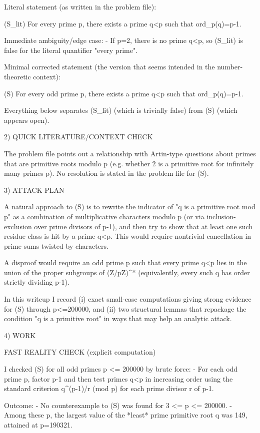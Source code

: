 Literal statement (as written in the problem file):

  (S_lit)  For every prime p, there exists a prime q<p such that ord_p(q)=p-1.

Immediate ambiguity/edge case:
- If p=2, there is no prime q<p, so (S_lit) is false for the literal quantifier "every prime".

Minimal corrected statement (the version that seems intended in the number-theoretic context):

  (S)  For every odd prime p, there exists a prime q<p such that ord_p(q)=p-1.

Everything below separates (S_lit) (which is trivially false) from (S) (which appears open).

2) QUICK LITERATURE/CONTEXT CHECK

The problem file points out a relationship with Artin-type questions about primes that are
primitive roots modulo p (e.g. whether 2 is a primitive root for infinitely many primes p).
No resolution is stated in the problem file for (S).

3) ATTACK PLAN

A natural approach to (S) is to rewrite the indicator of "q is a primitive root mod p" as a
combination of multiplicative characters modulo p (or via inclusion-exclusion over prime
divisors of p-1), and then try to show that at least one such residue class is hit by a prime
q<p. This would require nontrivial cancellation in prime sums twisted by characters.

A disproof would require an odd prime p such that every prime q<p lies in the union of the
proper subgroups of (Z/pZ)^* (equivalently, every such q has order strictly dividing p-1).

In this writeup I record (i) exact small-case computations giving strong evidence for (S)
through p<=200000, and (ii) two structural lemmas that repackage the condition "q is a
primitive root" in ways that may help an analytic attack.

4) WORK

FAST REALITY CHECK (explicit computation)

I checked (S) for all odd primes p <= 200000 by brute force:
- For each odd prime p, factor p-1 and then test primes q<p in increasing order using the
  standard criterion q^{(p-1)/r} \not{} (mod p) for each prime divisor r of p-1.

Outcome:
- No counterexample to (S) was found for 3 <= p <= 200000.
- Among these p, the largest value of the *least* prime primitive root q was 149, attained at
  p=190321.

